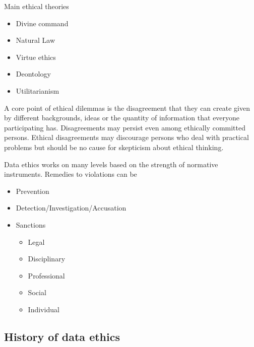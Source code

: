 \vspace{10pt}

Main ethical theories
\begin{itemize}
    \item Divine command
    \item Natural Law
    \item Virtue ethics
    \item Deontology
    \item Utilitarianism
\end{itemize}

A core point of ethical dilemmas is the disagreement that they can create given by different backgrounds, ideas or the quantity of information that everyone participating has. Disagreements may persist even among ethically committed persons.
Ethical disagreements may discourage persons who deal with practical problems but
should be no cause for skepticism about ethical thinking. 

\vspace{10pt}

Data ethics works on many levels based on the strength of normative instruments. Remedies to violations can be
\begin{itemize}
    \item Prevention
    \item Detection/Investigation/Accusation
    \item Sanctions 
    \begin{itemize}
        \item Legal
        \item Disciplinary
        \item Professional
        \item Social
        \item Individual
    \end{itemize}
\end{itemize}




















\subsection{History of data ethics}

